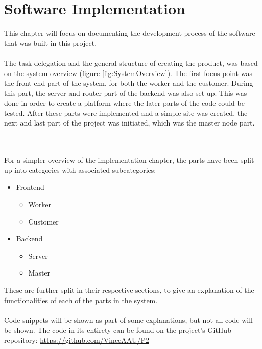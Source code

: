 \chapter{Software Implementation}
This chapter will focus on documenting the development process of the software that was built in this project.
\\ \\
The task delegation and the general structure of creating the product, was based on the system overview (figure \ref{fig:SystemOverview}). The first focus point was the front-end part of the system, for both the worker and the customer. During this part, the server and router part of the backend was also set up. This was done in order to create a platform where the later parts of the code could be tested. After these parts were implemented and a simple site was created, the next and last part of the project was initiated, which was the master node part.

\\ \\
For a simpler overview of the implementation chapter, the parts have been split up into categories with associated subcategories:

\begin{itemize}
    \item Frontend
    \begin{itemize}
        \item Worker
        \item Customer
    \end{itemize}
    \item Backend
    \begin{itemize}
        \item Server
        \item Master
    \end{itemize}
\end{itemize}


These are further split in their respective sections, to give an explanation of the functionalities of each of the parts in the system.
\\ \\
Code snippets will be shown as part of some explanations, but not all code will be shown. The code in its entirety can be found on the project's GitHub repository:
\href{https://github.com/VinceAAU/P2}{https://github.com/VinceAAU/P2}